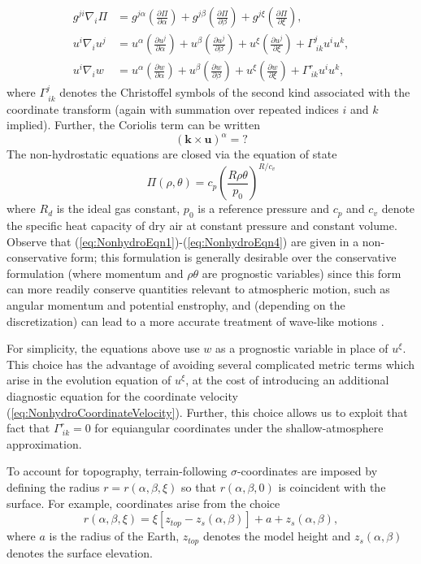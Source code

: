 \documentclass[gmdd, hvmath, online]{copernicus_discussions}
\newcommand{\vb}{\mathbf}
\newcommand{\pdiff}[2]{\frac{\partial #1}{\partial #2}}
\begin{document}
\begin{align}
g^{j i} \nabla_i \Pi &= g^{j \alpha} \left( \pdiff{\Pi}{\alpha} \right) + g^{j \beta} \left( \pdiff{\Pi}{\beta} \right) + g^{j \xi} \left( \pdiff{\Pi}{\xi} \right), \\
u^i \nabla_i u^j &= u^\alpha \left( \pdiff{u^j}{\alpha} \right) + u^\beta \left( \pdiff{u^j}{\beta} \right) + u^\xi \left( \pdiff{u^j}{\xi} \right) + \Gamma^{j}_{\ i k} u^i u^k, \\
u^i \nabla_i w &= u^\alpha \left( \pdiff{w}{\alpha} \right) + u^\beta \left( \pdiff{w}{\beta} \right) + u^\xi \left( \pdiff{w}{\xi} \right) + \Gamma^r_{\ i k} u^i u^k,
\end{align} where $\Gamma^j_{\ i k}$ denotes the Christoffel symbols of the second kind associated with the coordinate transform (again with summation over repeated indices $i$ and $k$ implied).  Further, the Coriolis term can be written
\begin{equation}
(\vb{k} \times \vb{u})^\alpha = ?
\end{equation}  The non-hydrostatic equations are closed via the equation of state
\begin{equation}
\Pi(\rho, \theta) = c_p \left( \frac{R \rho \theta}{p_0} \right)^{R/c_v}
\end{equation} where $R_d$ is the ideal gas constant, $p_0$ is a reference pressure and $c_p$ and $c_v$ denote the specific heat capacity of dry air at constant pressure and constant volume.  Observe that (\ref{eq:NonhydroEqn1})-(\ref{eq:NonhydroEqn4}) are given in a non-conservative form; this formulation is generally desirable over the conservative formulation (where momentum and $\rho \theta$ are prognostic variables) since this form can more readily conserve quantities relevant to atmospheric motion, such as angular momentum and potential enstrophy, and (depending on the discretization) can lead to a more accurate treatment of wave-like motions \citep{JTTJW2005JCP}.

For simplicity, the equations above use $w$ as a prognostic variable in place of $u^\xi$.  This choice has the advantage of avoiding several complicated metric terms which arise in the evolution equation of $u^\xi$, at the cost of introducing an additional diagnostic equation for the coordinate velocity (\ref{eq:NonhydroCoordinateVelocity}).  Further, this choice allows us to exploit that fact that $\Gamma^r_{\ i k} = 0$ for equiangular coordinates under the shallow-atmosphere approximation.

To account for topography, terrain-following $\sigma$-coordinates are imposed by defining the radius $r = r(\alpha, \beta, \xi)$ so that $r(\alpha, \beta, 0)$ is coincident with the surface.  For example, \cite{TGCRCJS1975JCP} coordinates arise from the choice
\begin{equation}
r(\alpha, \beta, \xi) = \xi \left[ z_{top} - z_s(\alpha, \beta) \right] + a + z_s(\alpha, \beta),
\end{equation} where $a$ is the radius of the Earth, $z_{top}$ denotes the model height and $z_s(\alpha, \beta)$ denotes the surface elevation.
\end{document}
